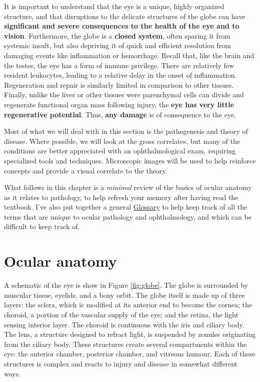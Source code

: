 \documentclass[openany]{book}
\begin{document}
It is important to understand that the eye is a unique, highly organized
structure, and that disruptions to the delicate structures of the globe
can have \textbf{significant and severe consequences to the health of
the eye and to vision}. Furthermore, the globe is a \textbf{closed
system}, often sparing it from systemic insult, but also depriving it of
quick and efficient resolution from damaging events like inflammation or
hemorrhage. Recall that, like the brain and the testes, the eye has a
form of immune privilege. There are relatively few resident leukocytes,
leading to a relative delay in the onset of inflammation. Regeneration
and repair is similarly limited in comparison to other tissues. Finally,
unlike the liver or other tissues were parenchymal cells can divide and
regenerate functional organ mass following injury, the \textbf{eye has
very little regenerative potential}. Thus, \textbf{any damage} is of
consequence to the eye.

Most of what we will deal with in this section is the pathogenesis and
theory of disease. Where possible, we will look at the gross correlates,
but many of the conditions are better appreciated with an
ophthalmological exam, requiring specialized tools and techniques.
Microscopic images will be used to help reinforce concepts and provide a
visual correlate to the theory.

What follows in this chapter is a \emph{minimal} review of the basics of
ocular anatomy as it relates to pathology, to help refresh your memory
after having read the textbook. I've also put together a general
\protect\hyperlink{glossary}{Glossary} to help keep track of all the
terms that are unique to ocular pathology and ophthalmology, and which
can be difficult to keep track of.

\hypertarget{ocular-anatomy}{\section{Ocular
anatomy}\label{ocular-anatomy}}

A schematic of the eye is show in Figure \ref{fig:globe}. The globe is
surrounded by muscular tissue, eyelids, and a bony orbit. The globe
itself is made up of three layers: the sclera, which is modified at its
anterior end to become the cornea; the choroid, a portion of the
vascular supply of the eye; and the retina, the light sensing interior
layer. The choroid is continuous with the iris and ciliary body. The
lens, a structure designed to refract light, is suspended by zonules
originating from the ciliary body. These structures create several
compartments within the eye: the anterior chamber, posterior chamber,
and vitreous humour. Each of these structures is complex and reacts to
injury and disease in somewhat different ways.
\end{document}
